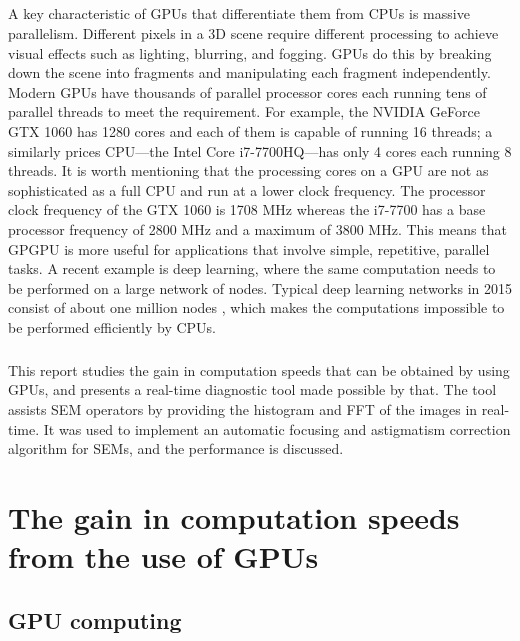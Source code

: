 \documentclass[12pt, twocolumn]{report}
\begin{document}
\paragraph{}
A key characteristic of GPUs that differentiate them from CPUs is massive parallelism. Different pixels in a 3D scene require different processing to achieve visual effects such as lighting, blurring, and fogging. GPUs do this by breaking down the scene into fragments and manipulating each fragment independently. Modern GPUs have thousands of parallel processor cores each running tens of parallel threads to meet the requirement. For example, the NVIDIA GeForce GTX 1060 has 1280 cores and each of them is capable of running 16 threads; a similarly prices CPU---the Intel Core i7-7700HQ---has only 4 cores each running 8 threads. It is worth mentioning that the processing cores on a GPU are not as sophisticated as a full CPU and run at a lower clock frequency. The processor clock frequency of the GTX 1060 is 1708 MHz whereas the i7-7700 has a base processor frequency of 2800 MHz and a maximum of 3800 MHz. This means that GPGPU is more useful for applications that involve simple, repetitive, parallel tasks. A recent example is deep learning, where the same computation needs to be performed on a large network of nodes. Typical deep learning networks in 2015 consist of about one million nodes \cite{Deep learning}, which makes the computations impossible to be performed efficiently by CPUs.

\paragraph{}
This report studies the gain in computation speeds that can be obtained by using GPUs, and presents a real-time diagnostic tool made possible by that. The tool assists SEM operators by providing the histogram and FFT of the images in real-time. It was used to implement an automatic focusing and astigmatism correction algorithm for SEMs, and the performance is discussed.

\chapter{The gain in computation speeds from the use of GPUs}
\section{GPU computing}
\end{document}
